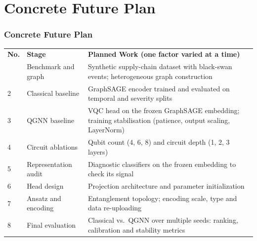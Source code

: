 \documentclass{beamer}
\newcommand{\tabfont}{\scriptsize}
\newcommand{\rowgap}{\addlinespace[4pt]}
\begin{document}
\section[Future Plan]{Concrete Future Plan}
\begin{frame}[t,shrink=12]
\frametitle{Concrete Future Plan}
\tabfont
\centering
\begin{tabularx}{\linewidth}{@{}>{\raggedright\arraybackslash}p{0.6cm}
                               >{\raggedright\arraybackslash}p{3.6cm}
                               >{\raggedright\arraybackslash}X@{}}
\multicolumn{3}{@{}c@{}}{\textbf{Table 4: Concrete Future Plan}} \\
\toprule
\textbf{No.} & \textbf{Stage} & \textbf{Planned Work (one factor varied at a time)} \\
\midrule
1 & Benchmark and graph &
Synthetic supply-chain dataset with black-swan events; heterogeneous graph
construction \\ \rowgap

2 & Classical baseline &
GraphSAGE encoder trained and evaluated on temporal and severity splits \\ \rowgap

3 & QGNN baseline &
VQC head on the frozen GraphSAGE embedding; training stabilisation (patience,
output scaling, LayerNorm) \\ \rowgap

4 & Circuit ablations &
Qubit count (4, 6, 8) and circuit depth (1, 2, 3 layers) \\ \rowgap

5 & Representation audit &
Diagnostic classifiers on the frozen embedding to check its signal \\ \rowgap

6 & Head design &
Projection architecture and parameter initialization \\ \rowgap

7 & Ansatz and encoding &
Entanglement topology; encoding scale, type and data re-uploading \\ \rowgap

8 & Final evaluation &
Classical vs.\ QGNN over multiple seeds: ranking, calibration and stability
metrics \\
\bottomrule
\end{tabularx}
\end{frame}
\end{document}
